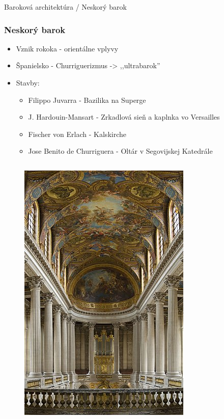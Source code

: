 \documentclass[dvipsnames]{beamer}
\begin{document}
\begin{frame}{\small \textcolor{g}{Baroková architektúra} / \Large Neskorý barok}
	\subsubsection{Neskorý barok}
	\begin{itemize}
		\item Vznik rokoka - orientálne vplyvy
		\item Španielsko - Churriguerizmus -> ,,ultrabarok''
		\item Stavby:
		\begin{itemize}
			\item \textcolor{BurntOrange}{Filippo Juvarra} - Bazilika na Superge
			\item \textcolor{BurntOrange}{J. Hardouin-Mansart} - Zrkadlová sieň a kaplnka vo Versailles
			\item \textcolor{BurntOrange}{Fischer von Erlach} - Kalskirche
			\item \textcolor{BurntOrange}{Jose Benito de Churriguera} - Oltár v Segovijskej Katedrále
		\end{itemize}
	\end{itemize}
	\vskip -4mm
	\begin{columns}
		\kern0pt
		\begin{figure}
			\includegraphics[scale=0.25]{verzajl}

\end{figure}
\end{columns}
\end{frame}
\end{document}
